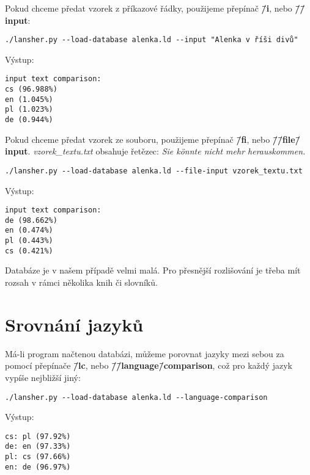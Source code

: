 \documentclass[11pt]{article}
\begin{document}
Pokud chceme předat vzorek z příkazové řádky, použijeme přepínač \textbf{\=/i}, nebo \textbf{\=/\=/input}:
\begin{lstlisting}
./lansher.py --load-database alenka.ld --input "Alenka v říši divů"
\end{lstlisting}

Výstup:
\begin{lstlisting}
input text comparison:
cs (96.988%)
en (1.045%)
pl (1.023%)
de (0.944%)
\end{lstlisting}


Pokud chceme předat vzorek ze souboru, použijeme přepínač \textbf{\=/fi}, nebo \textbf{\=/\=/file\=/input}. \textit{vzorek\_textu.txt} obsahuje řetězec: \textit{Sie könnte nicht mehr herauskommen.}
\begin{lstlisting}
./lansher.py --load-database alenka.ld --file-input vzorek_textu.txt
\end{lstlisting}

Výstup:
\begin{lstlisting}
input text comparison:
de (98.662%)
en (0.474%)
pl (0.443%)
cs (0.421%)
\end{lstlisting}

Databáze je v našem případě velmi malá. Pro přesnější rozlišování je třeba mít rozsah v rámci několika knih či slovníků.

\section{Srovnání jazyků}
Má-li program načtenou databázi, můžeme porovnat jazyky mezi sebou za pomocí přepínače \textbf{\=/lc}, nebo \textbf{\=/\=/language\=/comparison}, což pro každý jazyk vypíše nejbližší jiný:
\begin{lstlisting}
./lansher.py --load-database alenka.ld --language-comparison
\end{lstlisting}

Výstup:
\begin{lstlisting}
cs: pl (97.92%)
de: en (97.33%)
pl: cs (97.66%)
en: de (96.97%)
\end{lstlisting}
\end{document}
